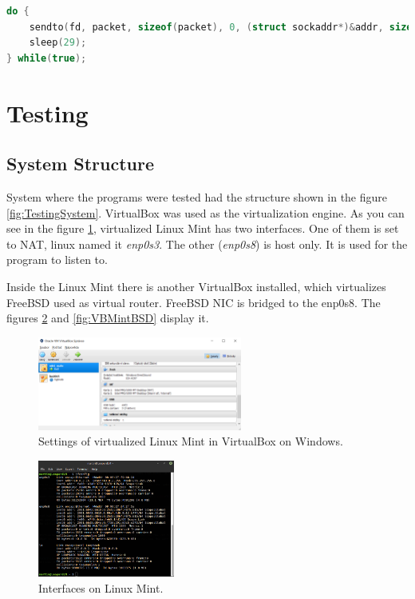 \documentclass[10pt,a4paper,titlepage]{article}
\begin{document}
            \begin{lstlisting}[language=c, basicstyle=\tiny]
do {
    sendto(fd, packet, sizeof(packet), 0, (struct sockaddr*)&addr, sizeof(address));
    sleep(29);
} while(true);
            \end{lstlisting}
    
    \newpage
    \section{Testing}
        
        \subsection{System Structure}
            System where the programs were tested had the structure shown in the figure \ref{fig:TestingSystem}.
            VirtualBox was used as the virtualization engine. As you can see in the figure \ref{fig:VBWinMint},
            virtualized Linux Mint has two interfaces. One of them is set to NAT, linux named it {\it enp0s3}.
            The other ({\it enp0s8}) is host only. It is used for the program to listen to.

            Inside the Linux Mint there is another VirtualBox installed, which virtualizes FreeBSD used as virtual
            router. FreeBSD NIC is bridged to the enp0s8. The figures \ref{fig:MintIfconfig}
            and \ref{fig:VBMintBSD} display it.

            \begin{figure}[h!]
                \begin{center}
                    \includegraphics[width=0.60\textwidth]{winmint.png}
                    \caption{Settings of virtualized Linux Mint in VirtualBox on Windows. \label{fig:VBWinMint}}
                \end{center}
            \end{figure}

            \begin{figure}[h!]
                \begin{center}
                    \includegraphics[width=0.40\textwidth]{mintifconfig.png}
                    \caption{Interfaces on Linux Mint. \label{fig:MintIfconfig}}
                \end{center}
            \end{figure}
\end{document}
